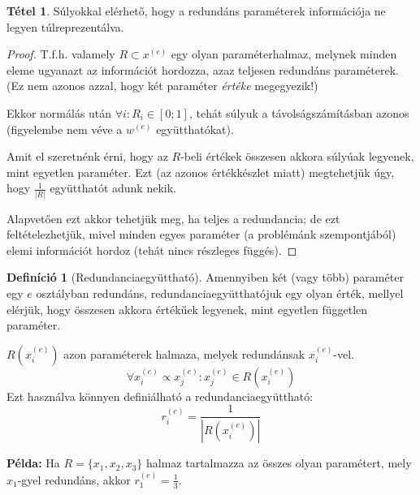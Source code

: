 \documentclass[twocolumn]{article}
\theoremstyle{definition}
\newtheorem{definition}{Definíció}[section]
\newtheorem{theorem}{Tétel}[section]
\newcommand{\pl}{ \textbf{Példa:} }
\newcommand{\ent}[2]{ {#1}^{(#2)} }
\begin{document}
    \begin{theorem}
        Súlyokkal elérhető, hogy a redundáns paraméterek információja ne legyen túlreprezentálva.
        
        \begin{proof}
            T.f.h. valamely $R \subset \ent x e$ egy olyan paraméterhalmaz, melynek minden eleme ugyanazt az információt hordozza, azaz teljesen redundáns paraméterek. (Ez nem azonos azzal, hogy két paraméter \textit{értéke} megegyezik!)
            
            Ekkor normálás után $\forall i: R_i \in [0;1]$, tehát súlyuk a távolságszámításban azonos (figyelembe nem véve a $\ent w e$ együtthatókat). 
            
            Amit el szeretnénk érni, hogy az $R$-beli értékek összesen akkora súlyúak legyenek, mint egyetlen paraméter. Ezt (az azonos értékkészlet miatt) megtehetjük úgy, hogy $\frac{1}{|R|}$ együtthatót adunk nekik.
            
            Alapvetően ezt akkor tehetjük meg, ha teljes a redundancia; de ezt feltételezhetjük, mivel minden egyes paraméter (a problémánk szempontjából) elemi információt hordoz (tehát nincs részleges függés).
        \end{proof}
    \end{theorem}
    
    \begin{definition}[Redundanciaegyüttható]
        Amennyiben két (vagy több) paraméter egy $e$ osztályban redundáns, redundanciaegyütthatójuk egy olyan érték, mellyel elérjük, hogy összesen akkora értékűek legyenek, mint egyetlen független paraméter.
        
        $R(\ent x e _i)$ azon paraméterek halmaza, melyek redundánsak $\ent x e _i$-vel.
        \begin{equation}
            \forall \ent x e _i \propto \ent x e _j : \ent x e _j \in R(\ent x e _i) 
        \end{equation}
        Ezt használva könnyen definiálható a redundanciaegyüttható:
        \begin{equation}
            \ent r e _i = \frac{1}{|R(\ent x e _i)|}
        \end{equation}
    \end{definition}
    
    \pl Ha $R = \{ x_1, x_2, x_3 \}$ halmaz tartalmazza az összes olyan paramétert, mely $x_1$-gyel redundáns, akkor $\ent r e _1 = \frac{1}{3}$.
    
\end{document}
